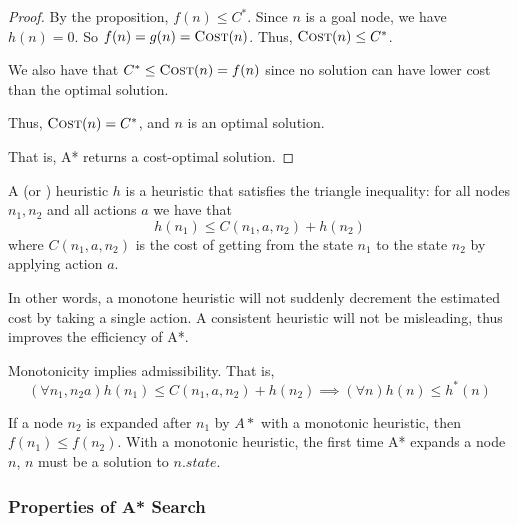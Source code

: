 \begin{listu}
\begin{proof}
        By the proposition, $f(n) \le C^*$. Since $n$ is a goal node, we have $h(n) = 0$. So $f(n) = g(n) = \textsc{Cost}(n)$. Thus, $\textsc{Cost}(n) \le C^*$.

        We also have that $C^* \le \textsc{Cost}(n) = f(n)$ since no solution can have lower cost than the optimal solution.

        Thus, $\textsc{Cost}(n) = C^*$, and $n$ is an optimal solution.

        That is, A* returns a cost-optimal solution.
    \end{proof}

    \begin{definition}\label{def:monotonicity}
        A  (or ) heuristic $h$ is a heuristic that satisfies the triangle inequality: for all nodes $n_1, n_2$ and all actions $a$ we have that \[
            h(n_1) \le C(n_1, a, n_2) + h(n_2)
        \] where $C(n_1, a, n_2)$ is the cost of getting from the state $n_1$ to the state $n_2$ by applying action $a$.
    \end{definition}

    In other words, a monotone heuristic will not suddenly decrement the estimated cost by taking a single action. A consistent heuristic will not be misleading, thus improves the efficiency of A*.

    \begin{theorem}
        Monotonicity implies admissibility. That is, \[
            (\forall n_1, n_2 a) h(n_1) \le C(n_1, a, n_2) + h(n_2) \implies (\forall n) h(n) \le h^*(n)
        \]
    \end{theorem}

    If a node $n_2$ is expanded after $n_1$ by $A*$ with a monotonic heuristic, then $f(n_1) \le f(n_2)$. With a monotonic heuristic, the first time A* expands a node $n$, $n$ must be a  solution to $n.state$.
\end{listu}

\subsubsection{Properties of A* Search}

